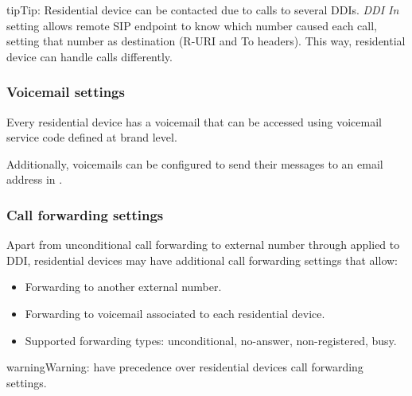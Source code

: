 \documentclass[letterpaper,10pt,english]{sphinxmanual}
\begin{document}
\begin{notice}{tip}{Tip:}
Residential device can be contacted due to calls to several DDIs. \emph{DDI In} setting allows remote SIP endpoint to
know which number caused each call, setting that number as destination (R-URI and To headers). This way, residential
device can handle calls differently.
\end{notice}


\subsubsection{Voicemail settings}
\label{administration_portal/client/residential/residential_devices:voicemail-settings}
Every residential device has a voicemail that can be accessed using voicemail service code defined at brand level.

Additionally, voicemails can be configured to send their messages to an email address in {\hyperref[administration_portal/client/residential/residential_voicemails:residential\string-voicemails]{}}.


\subsubsection{Call forwarding settings}
\label{administration_portal/client/residential/residential_devices:residential-devices-cfw}\label{administration_portal/client/residential/residential_devices:call-forwarding-settings}
Apart from unconditional call forwarding to external number through {\hyperref[administration_portal/client/vpbx/routing_tools/external_call_filters:external\string-call\string-filters]{}} applied to DDI,
residential devices may have additional call forwarding settings that allow:
\begin{itemize}
\item {} 
Forwarding to another external number.

\item {} 
Forwarding to voicemail associated to each residential device.

\item {} 
Supported forwarding types: unconditional, no-answer, non-registered, busy.

\end{itemize}

\begin{notice}{warning}{Warning:}
{\hyperref[administration_portal/client/vpbx/routing_tools/external_call_filters:external\string-call\string-filters]{}} have precedence over residential devices call forwarding settings.
\end{notice}
\end{document}
